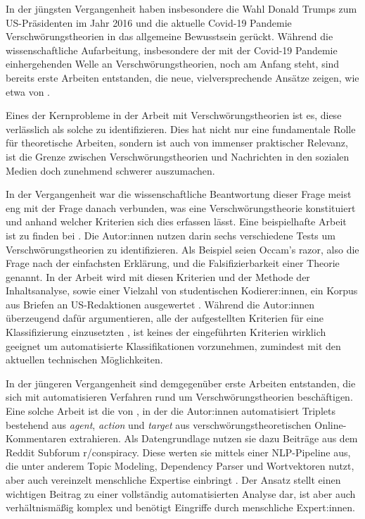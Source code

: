 In der jüngsten Vergangenheit haben insbesondere die Wahl Donald Trumps zum US-Präsidenten im Jahr 2016 und die aktuelle Covid-19 Pandemie Verschwörungstheorien in das allgemeine Bewusstsein gerückt.
Während die wissenschaftliche Aufarbeitung, insbesondere der mit der Covid-19 Pandemie einhergehenden Welle an Verschwörungstheorien, noch am Anfang steht, sind bereits erste Arbeiten entstanden, die neue, vielversprechende Ansätze zeigen, wie etwa von \textcite{shahsavari_2020}.

Eines der Kernprobleme in der Arbeit mit Verschwörungstheorien ist es, diese verlässlich als solche zu identifizieren.
Dies hat nicht nur eine fundamentale Rolle für theoretische Arbeiten, sondern ist auch von immenser praktischer Relevanz, ist die Grenze zwischen Verschwörungstheorien und Nachrichten in den sozialen Medien doch zunehmend schwerer auszumachen.

In der Vergangenheit war die wissenschaftliche Beantwortung dieser Frage meist eng mit der Frage danach verbunden, was eine Verschwörungstheorie konstituiert und anhand welcher Kriterien sich dies erfassen lässt.
Eine beispielhafte Arbeit ist zu finden bei \textcite{uscinski_2014}.
Die Autor:innen nutzen darin sechs verschiedene Tests um Verschwörungstheorien zu identifizieren. Als Beispiel seien Occam's razor, also die Frage nach der einfachsten Erklärung, und die Falsifizierbarkeit einer Theorie genannt.
In der Arbeit wird mit diesen Kriterien und der Methode der Inhaltsanalyse, sowie einer Vielzahl von studentischen Kodierer:innen, ein Korpus aus Briefen an US-Redaktionen ausgewertet \parencite[54ff]{uscinski_2014}.
Während die Autor:innen überzeugend dafür argumentieren, alle der aufgestellten Kriterien für eine Klassifizierung einzusetzten \parencite[52f]{uscinski_2014}, ist keines der eingeführten Kriterien wirklich geeignet um automatisierte Klassifikationen vorzunehmen, zumindest mit den aktuellen technischen Möglichkeiten.

In der jüngeren Vergangenheit sind demgegenüber erste Arbeiten entstanden, die sich mit automatisieren Verfahren rund um Verschwörungstheorien beschäftigen.
Eine solche Arbeit ist die von \textcite{samory_2018}, in der die Autor:innen automatisiert Triplets bestehend aus \textit{agent}, \textit{action} und \textit{target} aus verschwörungstheoretischen Online-Kommentaren extrahieren.
Als Datengrundlage nutzen sie dazu Beiträge aus dem Reddit Subforum r/conspiracy.
Diese werten sie mittels einer NLP-Pipeline aus, die unter anderem Topic Modeling, Dependency Parser und Wortvektoren nutzt, aber auch vereinzelt menschliche Expertise einbringt \parencite[][6ff]{samory_2018}.
Der Ansatz stellt einen wichtigen Beitrag zu einer vollständig automatisierten Analyse dar, ist aber auch verhältnismäßig komplex und benötigt Eingriffe durch menschliche Expert:innen.

